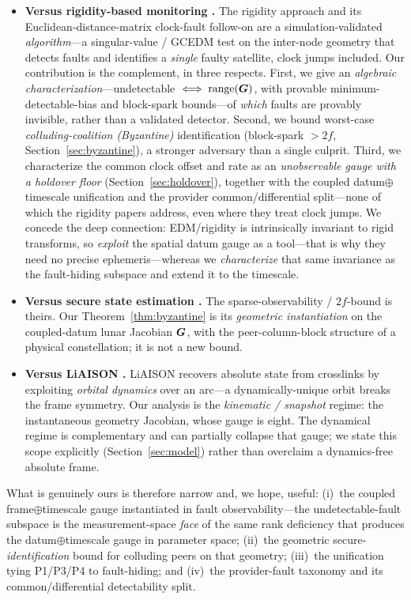 \begin{itemize}
  \item \textbf{Versus rigidity-based monitoring \citep{iiyama2024,iiyama2025edm}.} The
  rigidity approach and its Euclidean-distance-matrix clock-fault follow-on are a
  simulation-validated \emph{algorithm}---a singular-value / GCEDM test on the inter-node
  geometry that detects faults and identifies a \emph{single} faulty satellite, clock jumps
  included. Our contribution is the complement, in three respects. First, we give an
  \emph{algebraic characterization}---undetectable $\iff\operatorname{range}(\bm{G})$, with provable
  minimum-detectable-bias and block-spark bounds---of \emph{which} faults are provably
  invisible, rather than a validated detector. Second, we bound worst-case
  \emph{colluding-coalition (Byzantine)} identification (block-spark $>2f$,
  Section~\ref{sec:byzantine}), a stronger adversary than a single culprit. Third, we
  characterize the common clock offset and rate as an \emph{unobservable gauge with a holdover
  floor} (Section~\ref{sec:holdover}), together with the coupled datum$\oplus$timescale
  unification and the provider common/differential split---none of which the rigidity papers
  address, even where they treat clock jumps. We concede the deep connection: EDM/rigidity is
  intrinsically invariant to rigid transforms, so \citep{iiyama2024,iiyama2025edm}
  \emph{exploit} the spatial datum gauge as a tool---that is why they need no precise
  ephemeris---whereas we \emph{characterize} that same invariance as the fault-hiding subspace
  and extend it to the timescale.
  \item \textbf{Versus secure state estimation \citep{fawzi2014,shoukry2016}.} The
  sparse-observability / $2f$-bound is theirs. Our Theorem~\ref{thm:byzantine} is its
  \emph{geometric instantiation} on the coupled-datum lunar Jacobian $\bm{G}$, with the
  peer-column-block structure of a physical constellation; it is not a new bound.
  \item \textbf{Versus LiAISON \citep{hillborn2007}.} LiAISON recovers absolute state from
  crosslinks by exploiting \emph{orbital dynamics} over an arc---a dynamically-unique orbit
  breaks the frame symmetry. Our analysis is the \emph{kinematic / snapshot} regime: the
  instantaneous geometry Jacobian, whose gauge is eight. The dynamical regime is
  complementary and can partially collapse that gauge; we state this scope explicitly
  (Section~\ref{sec:model}) rather than overclaim a dynamics-free absolute frame.
\end{itemize}
What is genuinely ours is therefore narrow and, we hope, useful: (i)~the coupled
frame$\oplus$timescale gauge instantiated in fault observability---the undetectable-fault
subspace is the measurement-space \emph{face} of the same rank deficiency that produces the
datum$\oplus$timescale gauge in parameter space; (ii)~the
geometric secure-\emph{identification} bound for colluding peers on that geometry; (iii)~the
unification tying P1/P3/P4 to fault-hiding; and (iv)~the provider-fault taxonomy and its
common/differential detectability split.

